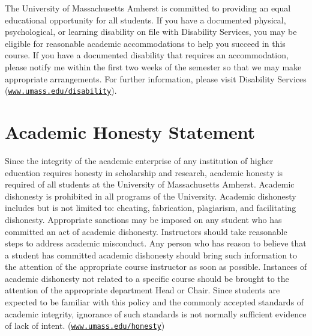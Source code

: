 \documentclass[11pt,letterpaper]{article}
\begin{document}
The University of Massachusetts Amherst is committed to providing an equal educational opportunity for all students. If you have a documented physical, psychological, or learning disability on file with Disability Services, you may be eligible for reasonable academic accommodations to help you succeed in this course. If you have a documented disability that requires an accommodation, please notify me within the first two weeks of the semester so that we may make appropriate arrangements. For further information, please visit Disability Services (\href{https://www.umass.edu/disability/}{\texttt{www.umass.edu/disability}}).

\section*{Academic Honesty Statement}

Since the integrity of the academic enterprise of any institution of higher education requires honesty in scholarship and research, academic honesty is required of all students at the University of Massachusetts Amherst. Academic dishonesty is prohibited in all programs of the University. Academic dishonesty includes but is not limited to: cheating, fabrication, plagiarism, and facilitating dishonesty. Appropriate sanctions may be imposed on any student who has committed an act of academic dishonesty. Instructors should take reasonable steps to address academic misconduct. Any person who has reason to believe that a student has committed academic dishonesty should bring such information to the attention of the appropriate course instructor as soon as possible. Instances of academic dishonesty not related to a specific course should be brought to the attention of the appropriate department Head or Chair. Since students are expected to be familiar with this policy and the commonly accepted standards of academic integrity, ignorance of such standards is not normally sufficient evidence of lack of intent. (\href{https://www.umass.edu/honesty/}{\texttt{www.umass.edu/honesty}})
\end{document}
